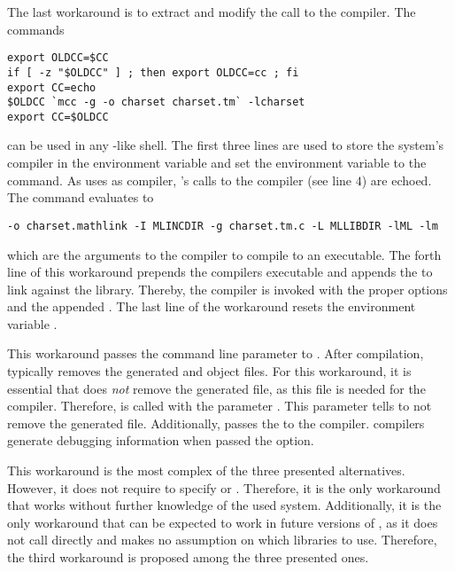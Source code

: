 The last workaround is to extract and modify the call to the \C compiler. The commands
\begin{verbatim}
export OLDCC=$CC 
if [ -z "$OLDCC" ] ; then export OLDCC=cc ; fi
export CC=echo
$OLDCC `mcc -g -o charset charset.tm` -lcharset
export CC=$OLDCC
\end{verbatim}
can be used in any \Bash-like shell. The first three lines are used to store the system's \C compiler in the environment variable  and set the environment variable  to the  command. As \Mcc uses  as \C compiler, \Mcc's calls to the \C compiler (see line $4$) are echoed. The command  evaluates to 
\begin{verbatim}
-o charset.mathlink -I MLINCDIR -g charset.tm.c -L MLLIBDIR -lML -lm
\end{verbatim}
which are the arguments to the \C compiler to compile to an executable. The forth line of this workaround prepends the \C compilers executable and appends the  to link against the \LibCharSet library. Thereby, the \C compiler is invoked with the proper options and the appended . The last line of the workaround resets the environment variable .

This workaround passes the command line parameter  to \Mcc. 
After compilation, \Mcc typically removes the generated \C and object files. For this workaround, it is essential that \Mcc does \emph{not} remove the generated \C file, as this file is needed for the \C compiler. Therefore, \Mcc is called with the parameter . This parameter tells \Mcc to not remove the generated \C file. Additionally, \Mcc passes the  to the \C compiler. \C compilers generate debugging information when passed the  option.

This workaround is the most complex of the three presented alternatives. However, it does not require to specify  or . Therefore, it is the only workaround that works without further knowledge of the used system. Additionally, it is the only workaround that can be expected to work in future versions of \MathLink, as it does not call \Mprep directly and makes no assumption on which libraries to use. Therefore, the third workaround is proposed among the three presented ones.

